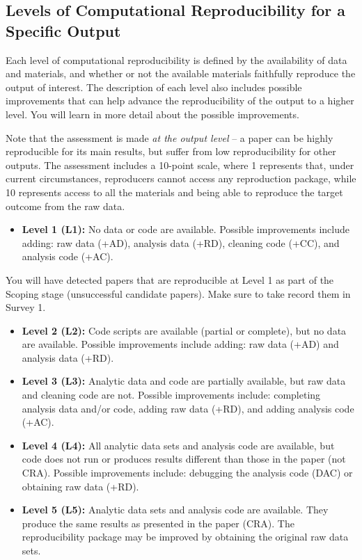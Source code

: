 \documentclass[]{book}
\providecommand{\tightlist}{%
  \setlength{\itemsep}{0pt}\setlength{\parskip}{0pt}}
\begin{document}
\hypertarget{levels-of-computational-reproducibility-for-a-specific-output}{%
\subsection{Levels of Computational Reproducibility for a Specific Output}\label{levels-of-computational-reproducibility-for-a-specific-output}}

Each level of computational reproducibility is defined by the availability of data and materials, and whether or not the available materials faithfully reproduce the output of interest. The description of each level also includes possible improvements that can help advance the reproducibility of the output to a higher level. You will learn in more detail about the possible improvements.

Note that the assessment is made \emph{at the output level} -- a paper can be highly reproducible for its main results, but suffer from low reproducibility for other outputs. The assessment includes a 10-point scale, where 1 represents that, under current circumstances, reproducers cannot access any reproduction package, while 10 represents access to all the materials and being able to reproduce the target outcome from the raw data.

\begin{itemize}
\tightlist
\item
  \textbf{Level 1 (L1):} No data or code are available. Possible improvements include adding: raw data (+AD), analysis data (+RD), cleaning code (+CC), and analysis code (+AC).
\end{itemize}

You will have detected papers that are reproducible at Level 1 as part of the Scoping stage (unsuccessful candidate papers). Make sure to take record them in Survey 1.

\begin{itemize}
\item
  \textbf{Level 2 (L2):} Code scripts are available (partial or complete), but no data are available. Possible improvements include adding: raw data (+AD) and analysis data (+RD).
\item
  \textbf{Level 3 (L3):} Analytic data and code are partially available, but raw data and cleaning code are not. Possible improvements include: completing analysis data and/or code, adding raw data (+RD), and adding analysis code (+AC).
\item
  \textbf{Level 4 (L4):} All analytic data sets and analysis code are available, but code does not run or produces results different than those in the paper (not CRA). Possible improvements include: debugging the analysis code (DAC) or obtaining raw data (+RD).
\item
  \textbf{Level 5 (L5):} Analytic data sets and analysis code are available. They produce the same results as presented in the paper (CRA). The reproducibility package may be improved by obtaining the original raw data sets.
\end{itemize}
\end{document}
